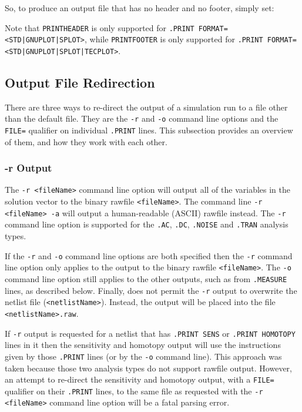 So, to produce an output file that has no header and no footer, simply set:

Note that \texttt{PRINTHEADER} is only supported for \texttt{.PRINT FORMAT=<STD|GNUPLOT|SPLOT>},
while \texttt{PRINTFOOTER} is only supported for \texttt{.PRINT FORMAT=<STD|GNUPLOT|SPLOT|TECPLOT>}.

\subsection{Output File Redirection}
There are three ways to re-direct the output of a \Xyce{} simulation run
to a file other than the default file.  They are the \verb+-r+ and 
\verb+-o+ command line options and the \texttt{FILE=} qualifier on  
individual \texttt{.PRINT} lines.  This subsection provides an overview of 
them, and how they work with each other. 

\subsubsection{-r Output}
The \verb+-r <fileName>+ command line option will output all of the variables 
in the solution vector to the binary rawfile \verb+<fileName>+.  The
command line \verb+-r  <fileName> -a+ will output a human-readable (ASCII) 
rawfile instead.  The \verb+-r+ command line option is supported for the
\texttt{.AC}, \texttt{.DC}, \texttt{.NOISE} and \texttt{.TRAN} analysis
types.  

If the \verb+-r+ and \verb+-o+ command line options are both specified then
the \verb+-r+ command line option only applies to the output to the binary
rawfile \verb+<fileName>+.  The \verb+-o+ command line option still applies
to the other outputs, such as from \texttt{.MEASURE} lines, as described below.
Finally, \Xyce{} does not permit the \verb+-r+ output to overwrite the netlist
file (\verb+<netlistName>+). Instead, the output will be placed into the
file \verb+<netlistName>.raw+.

If \verb+-r+ output is requested for a netlist that has \texttt{.PRINT SENS}
or \texttt{.PRINT HOMOTOPY} lines in it then the sensitivity and homotopy
output will use the instructions given by those \texttt{.PRINT} lines (or by the
\verb+-o+ command line).  This approach was taken because those two analysis types do not
support rawfile output.  However, an attempt to re-direct the sensitivity and homotopy output,
with a \texttt{FILE=} qualifier on their \texttt{.PRINT} lines, to the same file
as requested with the \verb+-r <fileName>+ command line option will be a
fatal parsing error.

